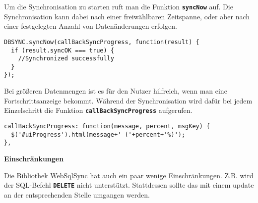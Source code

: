 Um die Synchronisation zu starten ruft man die Funktion \textbf{\lstinline$syncNow$} auf. Die Synchronisation kann dabei nach einer freiwählbaren Zeitspanne, oder aber nach einer festgelegten Anzahl von Datenänderungen erfolgen.

\lstset{language=html}
\begin{lstlisting}
DBSYNC.syncNow(callBackSyncProgress, function(result) {
  if (result.syncOK === true) {
    //Synchronized successfully
  }
});
\end{lstlisting}

Bei größeren Datenmengen ist es für den Nutzer hilfreich, wenn man eine Fortschrittsanzeige bekommt. Während der Synchronisation wird dafür bei jedem Einzelschritt die Funktion \textbf{\lstinline$callBackSyncProgress$} aufgerufen.

\lstset{language=html}
\begin{lstlisting}
callBackSyncProgress: function(message, percent, msgKey) {
  $('#uiProgress').html(message+' ('+percent+'%)');
},
\end{lstlisting}

\textbf{Einschränkungen}

Die Bibliothek WebSqlSync hat auch ein paar wenige Einschränkungen. Z.B. wird der \ac{SQL}-Befehl \textbf{\lstinline$DELETE$} nicht unterstützt. Stattdessen sollte das mit einem update an der entsprechenden Stelle umgangen werden.






